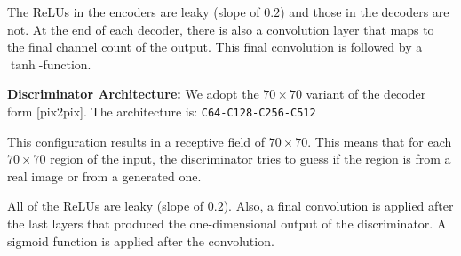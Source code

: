 \documentclass{llncs}
\begin{document}
\begin{subappendices}
The ReLUs in the encoders are leaky (slope of $0.2$) and those in the decoders are not. At the end of each decoder, there is also a convolution layer that maps to the final channel count of the output. This final convolution is followed by a $\tanh$-function.

\noindent\textbf{Discriminator Architecture:}
We adopt the $70\times70$ variant of the decoder form [pix2pix]. The architecture is:\newline
\texttt{C64-C128-C256-C512}

This configuration results in a receptive field of $70\times70$. This means that for each $70\times70$ region of the input, the discriminator tries to guess if the region is from a real image or from a generated one.

All of the ReLUs are leaky (slope of $0.2$). Also, a final convolution is applied after the last layers that produced the one-dimensional output of the discriminator. A sigmoid function is applied after the convolution.
\end{subappendices}
\end{document}
